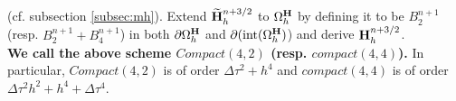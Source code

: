 \documentclass[12pt,reqno]{amsart}
\newcommand{\e}{{\bf E}}
\newcommand{\h}{{\bf H}}
\newcommand{\J}{{\bf J}}
\newtheorem{rem}[theorem]{Remark}
\theoremstyle{definition}
\numberwithin{equation}{section}
\newcommand{\intr}[1]{\mathrm{int}(#1)}
\def\Gwh{\Omega_h}
\begin{document}
(cf. subsection \ref{subsec:mh}).
		Extend $\widetilde{\h}_h^{n+3/2}$ 
	to $\Gwh^\h$ by defining it to be 
$B_2^{n+1}$ (resp. $B_2^{n+1}+B_4^{n+1}$)
	in both $\partial \Gwh^\h$ and $\partial (\intr{\Gwh^{\h}}$)
	and derive $\h_h^{n+3/2}$. \\[2mm]
{\bf We call the above scheme $Compact(4,2)$ (resp. $compact(4,4)$).}
In particular, $Compact(4,2)$ is of order $\Delta \tau^2+h^4$ and 
$compact(4,4)$ is of order $\Delta\tau^2h^2+h^4+\Delta \tau^4$.
%
%
%
   
%
\end{document}
